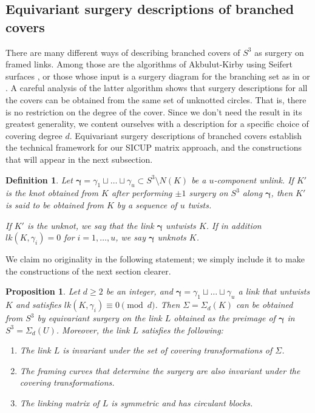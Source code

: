 \documentclass[11pt]{amsart}
\newtheorem{proposition}[theorem]{Proposition}
\newtheorem{definition}[theorem]{Definition}
\begin{document}
\subsection{Equivariant surgery descriptions of branched covers}

There are many different ways of describing branched covers of $S^3$ as surgery on framed links. Among those are the algorithms of Akbulut-Kirby using Seifert surfaces \cite{akbulut-kirby}, or those whose input is a surgery diagram for the branching set as in \cite[Chapters 6C, 10C]{rolfsen} or \cite[Theorem 3]{goldsmith}. A careful analysis of the latter algorithm shows that surgery descriptions for all the covers can be obtained from the same set of unknotted circles. That is, there is no restriction on the degree of the cover. Since we don't need the result in its greatest generality, we content ourselves with a description for a specific choice of covering degree $d$. Equivariant surgery descriptions of branched covers establish the technical framework for our SICUP matrix approach, and the constructions that will appear in the next subsection.

\begin{definition} Let $\boldsymbol\gamma=\gamma_1\sqcup\ldots\sqcup\gamma_u\subset S^3\setminus N(K)$ be a $u$-component unlink. If $K'$ is the knot obtained from $K$ after performing $\pm 1$ surgery on $S^3$ along $\boldsymbol\gamma$, then $K'$ is said to be obtained from $K$ by a sequence of $u$ twists.

If $K'$ is the unknot, we say that the link $\boldsymbol\gamma$ untwists $K$. If in addition $lk(K,\gamma_i)=0$ for $i=1,\ldots,u$, we say $\boldsymbol\gamma$ unknots $K$.
\end{definition}

We claim no originality in the following statement; we simply include it to make the constructions of the next section clearer.

\begin{proposition}\label{surgery_cover} Let $d\geq 2$ be an integer, and $\boldsymbol\gamma=\gamma_1\sqcup\ldots\sqcup\gamma_u$ a link that untwists $K$ and satisfies $lk(K,\gamma_i)\equiv 0 \pmod{d}$. Then $\Sigma=\Sigma_d(K)$ can be obtained from $S^3$ by equivariant surgery on the link $L$ obtained as the preimage of $\boldsymbol\gamma$ in $S^3=\Sigma_d(U)$. Moreover, the link $L$ satisfies the following:
\begin{enumerate}
\item The link $L$ is invariant under the set of covering transformations of $\Sigma$.
\item The framing curves that determine the surgery are also invariant under the covering transformations.
\item The linking matrix of $L$ is symmetric and has circulant blocks.
\end{enumerate}
\end{proposition}
\end{document}
